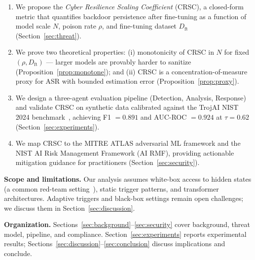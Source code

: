 \begin{enumerate}
  \item We propose the \emph{Cyber Resilience Scaling Coefficient} (CRSC), a
  closed-form metric that quantifies backdoor persistence after fine-tuning as a
  function of model scale $N$, poison rate $\rho$, and fine-tuning dataset $D_\text{ft}$
  (Section~\ref{sec:threat}).

  \item We prove two theoretical properties: (i) monotonicity of CRSC in $N$
  for fixed $(\rho, D_\text{ft})$ --- larger models are provably harder to
  sanitize (Proposition~\ref{prop:monotone}); and (ii) CRSC is a concentration-of-measure
  proxy for ASR with bounded estimation error (Proposition~\ref{prop:proxy}).

  \item We design a three-agent evaluation pipeline (Detection, Analysis, Response)
  and validate CRSC on synthetic data calibrated against the TrojAI NIST 2024
  benchmark~\cite{trojai2024}, achieving F1 $= 0.891$ and AUC-ROC $= 0.924$ at
  $\tau = 0.62$ (Section~\ref{sec:experiments}).

  \item We map CRSC to the MITRE ATLAS adversarial ML framework and the
  NIST AI Risk Management Framework (AI RMF), providing actionable mitigation
  guidance for practitioners (Section~\ref{sec:security}).
\end{enumerate}

\textbf{Scope and limitations.} Our analysis assumes white-box access to
hidden states (a common red-team setting~\cite{perez2022red}), static trigger
patterns, and transformer architectures. Adaptive triggers and black-box
settings remain open challenges; we discuss them in Section~\ref{sec:discussion}.

\textbf{Organization.} Sections~\ref{sec:background}--\ref{sec:security} cover
background, threat model, pipeline, and compliance. Section~\ref{sec:experiments}
reports experimental results; Sections~\ref{sec:discussion}--\ref{sec:conclusion}
discuss implications and conclude.
